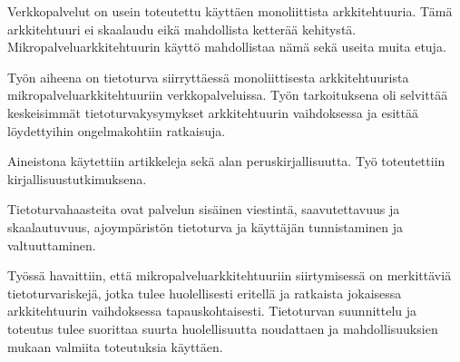 
\begin{fiabstract}
    \begin{sloppypar}
        Verkkopalvelut on usein toteutettu käyttäen monoliittista 
        arkkitehtuuria. Tämä arkkitehtuuri ei skaalaudu eikä mahdollista 
        ketterää kehitystä. Mikropalveluarkkitehtuurin käyttö mahdollistaa nämä 
        sekä useita muita etuja.
    \end{sloppypar}
    \begin{sloppypar}    
        Työn aiheena on tietoturva siirryttäessä 
        monoliittisesta arkkitehtuurista mikropalveluarkkitehtuuriin 
        verkkopalveluissa. Työn tarkoituksena oli selvittää 
        keskeisimmät tietoturvakysymykset arkkitehtuurin vaihdoksessa ja 
        esittää löydettyihin ongelmakohtiin ratkaisuja.
    \end{sloppypar}
    \begin{sloppypar}
        Aineistona käytettiin artikkeleja sekä alan 
        peruskirjallisuutta. Työ toteutettiin kirjallisuustutkimuksena.
    \end{sloppypar}
    \begin{sloppypar}        
        Tietoturvahaasteita ovat palvelun sisäinen viestintä, saavutettavuus ja 
        skaalautuvuus, ajoympäristön tietoturva ja käyttäjän tunnistaminen ja 
        valtuuttaminen.
    \end{sloppypar}
    \begin{sloppypar}
        Työssä havaittiin, että mikropalveluarkkitehtuuriin siirtymisessä on 
        merkittäviä tietoturvariskejä, jotka tulee huolellisesti eritellä ja 
        ratkaista jokaisessa arkkitehtuurin vaihdoksessa tapauskohtaisesti. 
        Tietoturvan suunnittelu ja toteutus tulee suorittaa suurta 
        huolellisuutta noudattaen ja mahdollisuuksien mukaan valmiita 
        toteutuksia käyttäen.
    \end{sloppypar}
\end{fiabstract}







